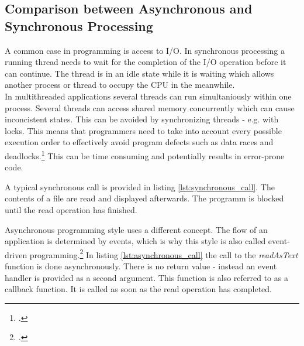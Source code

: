 \subsection{Comparison between Asynchronous and Synchronous Processing}
\label{comparison}

A common case in programming is access to I/O.
In synchronous processing a running thread needs to wait for the completion of
the I/O operation before it can continue.
The thread is in an idle state while it is waiting which allows another process 
or thread to occupy the CPU in the meanwhile.\\

In multithreaded applications several threads can run simultaniously within one 
process. Several threads can access shared memory concurrently which can
cause inconcistent states. This can be avoided by synchronizing threads - e.g.
with locks. This means that programmers need to take into account every possible
execution order to effectively avoid program defects such as data races and 
deadlocks.\footcite[Cf.][10]{Breshears_2009}
This can be time consuming and potentially results in error-prone code.

A typical synchronous call is provided in listing \ref{lst:synchronous_call}. The
contents of a file are read and displayed afterwards. The programm is blocked until the
read operation has finished.




Asynchronous programming style uses a different concept. The flow of an
application is determined by events, which is why this style is also called
event-driven programming.\footcite[Cf.][16]{teixeira_2012} In listing \ref{lst:asynchronous_call} the call
to the \textit{readAsText} function is done asynchronously. There is no
return value - instead an event handler is provided as a second argument.
This function is also referred to as a callback function. It is called
as soon as the read operation has completed.



